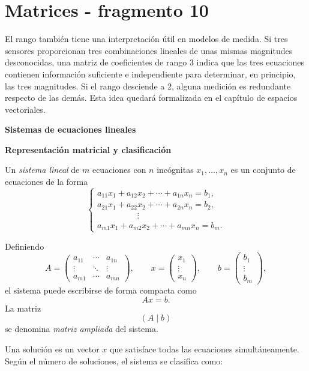 \section{Matrices - fragmento 10}
El rango también tiene una interpretación útil en modelos de medida. Si tres sensores proporcionan tres combinaciones lineales de unas mismas magnitudes desconocidas, una matriz de coeficientes de rango $3$ indica que las tres ecuaciones contienen información suficiente e independiente para determinar, en principio, las tres magnitudes. Si el rango desciende a $2$, alguna medición es redundante respecto de las demás. Esta idea quedará formalizada en el capítulo de espacios vectoriales.

\textbf{Sistemas de ecuaciones lineales}

\textbf{Representación matricial y clasificación}

\begin{definition}
Un \emph{sistema lineal} de $m$ ecuaciones con $n$ incógnitas $x_1,\ldots,x_n$ es un conjunto de ecuaciones de la forma
\[
\begin{cases}
a_{11}x_1+a_{12}x_2+\cdots+a_{1n}x_n=b_1,\\
a_{21}x_1+a_{22}x_2+\cdots+a_{2n}x_n=b_2,\\
\hspace{2cm}\vdots\\
a_{m1}x_1+a_{m2}x_2+\cdots+a_{mn}x_n=b_m.
\end{cases}
\]
\end{definition}

Definiendo
\[
A=
\begin{pmatrix}
a_{11}&\cdots&a_{1n}\\
\vdots&\ddots&\vdots\\
a_{m1}&\cdots&a_{mn}
\end{pmatrix},
\qquad
x=\begin{pmatrix}x_1\\\vdots\\x_n\end{pmatrix},
\qquad
b=\begin{pmatrix}b_1\\\vdots\\b_m\end{pmatrix},
\]
el sistema puede escribirse de forma compacta como
\[
\boxed{Ax=b.}
\]
La matriz
\[
(A\mid b)
\]
se denomina \emph{matriz ampliada} del sistema.

Una solución es un vector $x$ que satisface todas las ecuaciones simultáneamente. Según el número de soluciones, el sistema se clasifica como:

